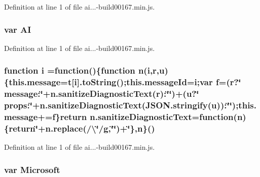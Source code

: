 Definition at line 1 of file ai...-\/build00167.\+min.\+js.

\subsubsection[{\texorpdfstring{AI}{AI}}]{\setlength{\rightskip}{0pt plus 5cm}var AI}\hypertarget{_scripts_2ai_80_822_89-build00167_8min_8js_a55ad59345b2b1d61457e94250a7d7957}{}\label{_scripts_2ai_80_822_89-build00167_8min_8js_a55ad59345b2b1d61457e94250a7d7957}


Definition at line 1 of file ai...-\/build00167.\+min.\+js.

\subsubsection[{\texorpdfstring{i}{i}}]{\setlength{\rightskip}{0pt plus 5cm}function i =function()\{function {\bf n}(i,{\bf r},{\bf u})\{this.\+message={\bf t}\mbox{[}i\mbox{]}.to\+String();this.\+message\+Id=i;var {\bf f}=({\bf r}?\char`\"{} message\+:\char`\"{}+n.\+sanitize\+Diagnostic\+Text({\bf r})\+:\char`\"{}\char`\"{})+({\bf u}?\char`\"{} props\+:\char`\"{}+n.\+sanitize\+Diagnostic\+Text(J\+S\+O\+N.\+stringify({\bf u}))\+:\char`\"{}\char`\"{});this.\+message+={\bf f}\}return n.\+sanitize\+Diagnostic\+Text=function({\bf n})\{return\textquotesingle{}\char`\"{}\textquotesingle{}+n.\+replace(/\textbackslash{}\char`\"{}/g,\char`\"{}\char`\"{})+\textquotesingle{}\char`\"{}\textquotesingle{}\},n\}()}\hypertarget{_scripts_2ai_80_822_89-build00167_8min_8js_aba29173262d28394924f99eb2ed5b31b}{}\label{_scripts_2ai_80_822_89-build00167_8min_8js_aba29173262d28394924f99eb2ed5b31b}


Definition at line 1 of file ai...-\/build00167.\+min.\+js.

\subsubsection[{\texorpdfstring{Microsoft}{Microsoft}}]{\setlength{\rightskip}{0pt plus 5cm}var Microsoft}\hypertarget{_scripts_2ai_80_822_89-build00167_8min_8js_aa433b7f6d0ec7586ed58f54451523cdf}{}\label{_scripts_2ai_80_822_89-build00167_8min_8js_aa433b7f6d0ec7586ed58f54451523cdf}


